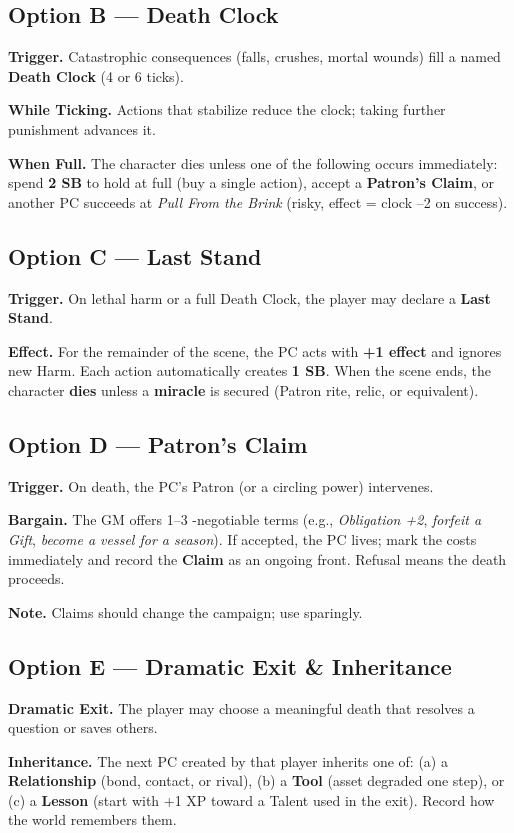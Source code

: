 \subsection*{Option B — Death Clock}\label{subsec:death-clock}
\textbf{Trigger.} Catastrophic consequences (falls, crushes, mortal wounds) fill a named \textbf{Death Clock} (4 or 6 ticks).\par
\textbf{While Ticking.} Actions that stabilize reduce the clock; taking further punishment advances it.\par
\textbf{When Full.} The character dies unless one of the following occurs immediately: spend \textbf{2 SB} to hold at full (buy a single action), accept a \textbf{Patron’s Claim}, or another PC succeeds at \emph{Pull From the Brink} (risky, effect = clock –2 on success).

\subsection*{Option C — Last Stand}\label{subsec:last-stand}
\textbf{Trigger.} On lethal harm or a full Death Clock, the player may declare a \textbf{Last Stand}.\par
\textbf{Effect.} For the remainder of the scene, the PC acts with \textbf{+1 effect} and ignores new Harm. Each action automatically creates \textbf{1 SB}. When the scene ends, the character \textbf{dies} unless a \textbf{miracle} is secured (Patron rite, relic, or equivalent).

\subsection*{Option D — Patron’s Claim}\label{subsec:patron-claim}
\textbf{Trigger.} On death, the PC’s Patron (or a circling power) intervenes.\par
\textbf{Bargain.} The GM offers 1–3 \non-negotiable terms (e.g., \emph{Obligation +2}, \emph{forfeit a Gift}, \emph{become a vessel for a season}). If accepted, the PC lives; mark the costs immediately and record the \textbf{Claim} as an ongoing front. Refusal means the death proceeds.\par
\textbf{Note.} Claims should change the campaign; use sparingly.

\subsection*{Option E — Dramatic Exit & Inheritance}\label{subsec:inheritance}
\textbf{Dramatic Exit.} The player may choose a meaningful death that resolves a question or saves others.\par
\textbf{Inheritance.} The next PC created by that player inherits one of: (a) a \textbf{Relationship} (bond, contact, or rival), (b) a \textbf{Tool} (asset degraded one step), or (c) a \textbf{Lesson} (start with +1 XP toward a Talent used in the exit). Record how the world remembers them.

